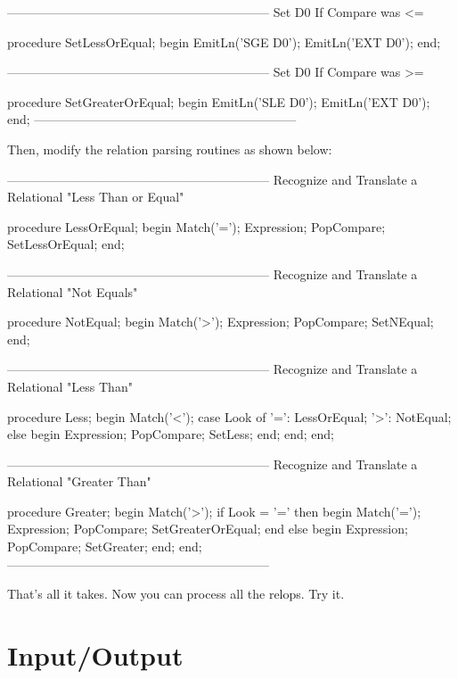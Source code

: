 \documentclass[float=false, crop=false]{standalone}
\begin{document}
\begin{code}
{---------------------------------------------------------------}
{ Set D0 If Compare was <= }

procedure SetLessOrEqual;
begin
   EmitLn('SGE D0');
   EmitLn('EXT D0');
end;


{---------------------------------------------------------------}
{ Set D0 If Compare was >= }

procedure SetGreaterOrEqual;
begin
   EmitLn('SLE D0');
   EmitLn('EXT D0');
end;
{---------------------------------------------------------------}


Then, modify the relation parsing routines as shown below:


{---------------------------------------------------------------}
{ Recognize and Translate a Relational "Less Than or Equal" }

procedure LessOrEqual;
begin
   Match('=');
   Expression;
   PopCompare;
   SetLessOrEqual;
end;


{---------------------------------------------------------------}
{ Recognize and Translate a Relational "Not Equals" }

procedure NotEqual;
begin
   Match('>');
   Expression;
   PopCompare;
   SetNEqual;
end;


{---------------------------------------------------------------}
{ Recognize and Translate a Relational "Less Than" }

procedure Less;
begin
   Match('<');
   case Look of
     '=': LessOrEqual;
     '>': NotEqual;
   else begin
           Expression;
           PopCompare;
           SetLess;
        end;
   end;
end;


{---------------------------------------------------------------}
{ Recognize and Translate a Relational "Greater Than" }

procedure Greater;
begin
   Match('>');
   if Look = '=' then begin
      Match('=');
      Expression;
      PopCompare;
      SetGreaterOrEqual;
      end
   else begin
      Expression;
      PopCompare;
      SetGreater;
   end;
end;
{---------------------------------------------------------------}
\end{code}

That's all it takes.  Now  you  can  process all the relops.  Try
it.


\section{Input/Output}
\end{document}
